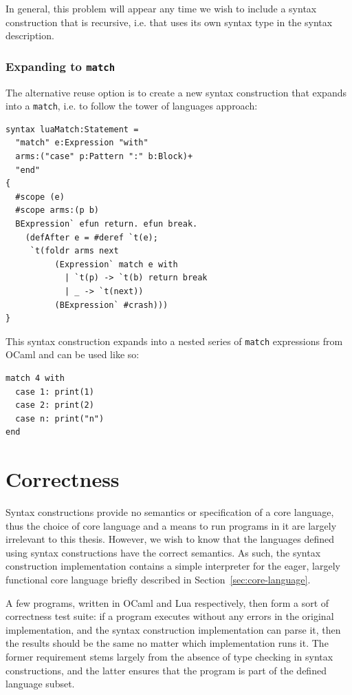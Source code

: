 \documentclass{kththesis}
\begin{document}
In general, this problem will appear any time we wish to include a syntax construction that is recursive, i.e. that uses its own syntax type in the syntax description. %

\subsubsection{Expanding to \texttt{match}}

The alternative reuse option is to create a new syntax construction that expands into a \texttt{match}, i.e. to follow the tower of languages approach:

\begin{verbatim}
syntax luaMatch:Statement =
  "match" e:Expression "with"
  arms:("case" p:Pattern ":" b:Block)+
  "end"
{
  #scope (e)
  #scope arms:(p b)
  BExpression` efun return. efun break.
    (defAfter e = #deref `t(e);
     `t(foldr arms next
          (Expression` match e with
            | `t(p) -> `t(b) return break
            | _ -> `t(next))
          (BExpression` #crash)))
}
\end{verbatim}

This syntax construction expands into a nested series of \texttt{match} expressions from OCaml and can be used like so:

\begin{verbatim}
match 4 with
  case 1: print(1)
  case 2: print(2)
  case n: print("n")
end
\end{verbatim}

\section{Correctness} \label{sec:correctness-and-performance}

Syntax constructions provide no semantics or specification of a core language, thus the choice of core language and a means to run programs in it are largely irrelevant to this thesis. However, we wish to know that the languages defined using syntax constructions have the correct semantics. As such, the syntax construction implementation contains a simple interpreter for the eager, largely functional core language briefly described in Section~\ref{sec:core-language}.

A few programs, written in OCaml and Lua respectively, then form a sort of correctness test suite: if a program executes without any errors in the original implementation, and the syntax construction implementation can parse it, then the results should be the same no matter which implementation runs it. The former requirement stems largely from the absence of type checking in syntax constructions, and the latter ensures that the program is part of the defined language subset.
\end{document}
